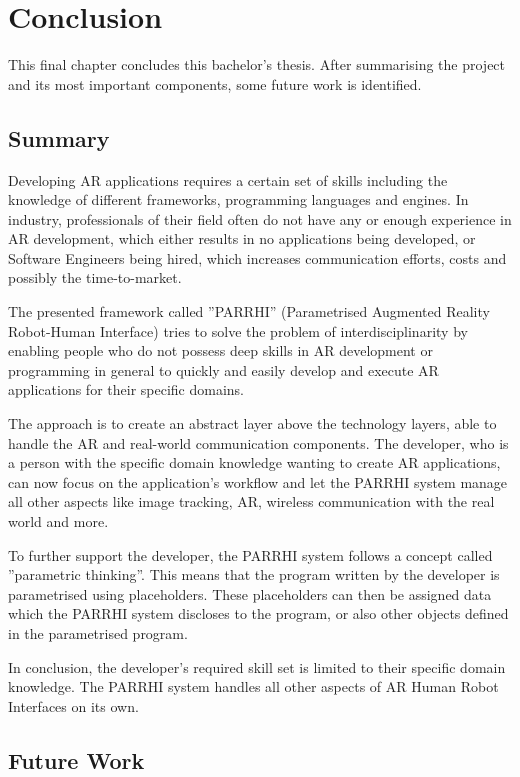 \chapter{Conclusion}\label{Chap:Conclusion}

This final chapter concludes this bachelor’s thesis. After summarising the project and its most important components, some future work is identified. 

\section{Summary}

Developing AR applications requires a certain set of skills including the knowledge of different frameworks, programming languages and engines. In industry, professionals of their field often do not have any or enough experience in AR development, which either results in no applications being developed, or Software Engineers being hired, which increases communication efforts, costs and possibly the time-to-market.

The presented framework called ”PARRHI” (Parametrised Augmented Reality Robot-Human Interface) tries to solve the problem of interdisciplinarity by enabling people who do not possess deep skills in AR development or programming in general to quickly and easily develop and execute AR applications for their specific domains.

The approach is to create an abstract layer above the technology layers, able to handle the AR and real-world communication components. The developer, who is a person with the specific domain knowledge wanting to create AR applications, can now focus on the application’s workflow and let the PARRHI system manage all other aspects like image tracking, AR, wireless communication with the real world and more.

To further support the developer, the PARRHI system follows a concept called ”parametric thinking”. This means that the program written by the developer is parametrised using placeholders. These placeholders can then be assigned data which the PARRHI system discloses to the program, or also other objects defined in the parametrised program. 

In conclusion, the developer’s required skill set is limited to their specific domain knowledge. The PARRHI system handles all other aspects of AR Human Robot Interfaces on its own.

\section{Future Work}\label{Section:FutureWork}

